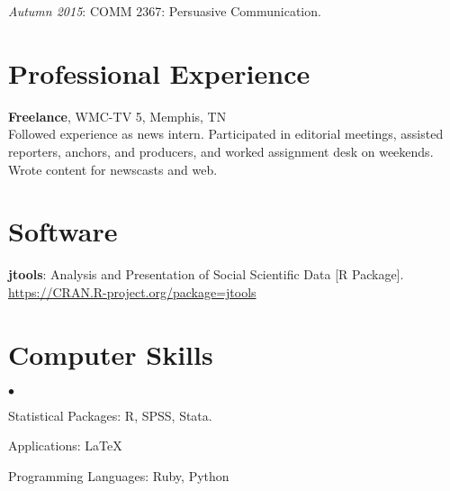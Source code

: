 \documentclass[margin,line]{res}
\newenvironment{list2}{
  \begin{list}{$\bullet$}{%
      \setlength{\itemsep}{0in}
      \setlength{\parsep}{0in} \setlength{\parskip}{0in}
      \setlength{\topsep}{0in} \setlength{\partopsep}{0in} 
      \setlength{\leftmargin}{0.2in}}}{\end{list}}
\begin{document}
\begin{resume}
\vspace*{-2.5mm}
\emph{Autumn 2015}: COMM 2367: Persuasive Communication.

\section{\sc Professional Experience}
{\bf Freelance}, WMC-TV 5, Memphis, TN\\
Followed experience as news intern. Participated in editorial meetings, assisted reporters, anchors, and producers, and worked assignment desk on weekends. Wrote content for newscasts and web.



\section{\sc Software} 

\textbf{jtools}: Analysis and Presentation of Social Scientific Data [R Package]. \url{https://CRAN.R-project.org/package=jtools}

\section{\sc Computer Skills} 
\begin{list2}
\item Statistical Packages:  R, SPSS, Stata.
\item Applications: \LaTeX
\item Programming Languages: Ruby, Python\\ 
\end{list2}



\end{resume}
\end{document}
